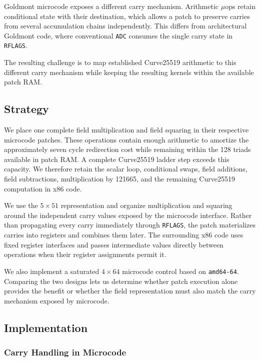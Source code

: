 \documentclass[journal=tches,submission]{iacrtrans}
\newcommand{\code}[1]{\texttt{#1}}
\begin{document}
Goldmont microcode exposes a different carry mechanism.
Arithmetic $\mu$ops retain conditional state with their destination, which allows a patch to preserve carries from several accumulation chains independently.
This differs from architectural Goldmont code, where conventional \code{ADC} consumes the single carry state in \code{RFLAGS}.

The resulting challenge is to map established Curve25519 arithmetic to this different carry mechanism while keeping the resulting kernels within the available patch RAM.

\subsection{Strategy}
\label{sec:c-strategy}

We place one complete field multiplication and field squaring in their respective microcode patches.
These operations contain enough arithmetic to amortize the approximately seven cycle redirection cost while remaining within the 128 triads available in patch RAM.
A complete Curve25519 ladder step exceeds this capacity.
We therefore retain the scalar loop, conditional swaps, field additions, field subtractions, multiplication by 121665, and the remaining Curve25519 computation in x86 code.

We use the $5\times51$ representation and organize multiplication and squaring around the independent carry values exposed by the microcode interface.
Rather than propagating every carry immediately through \code{RFLAGS}, the patch materializes carries into registers and combines them later.
The surrounding x86 code uses fixed register interfaces and passes intermediate values directly between operations when their register assignments permit it.

We also implement a saturated $4\times64$ microcode control based on \texttt{amd64-64}.
Comparing the two designs lets us determine whether patch execution alone provides the benefit or whether the field representation must also match the carry mechanism exposed by microcode.

\subsection{Implementation}

\subsubsection{Carry Handling in Microcode}
\label{sec:c25519-carries}
\end{document}
